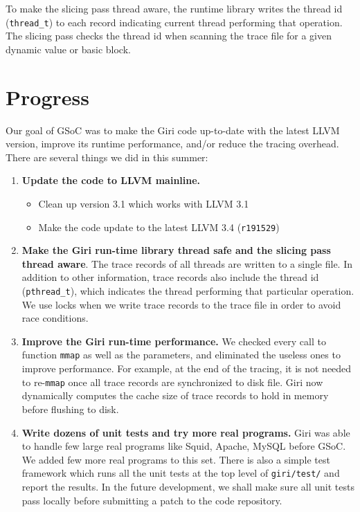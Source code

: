 \documentclass[DIV=calc, paper=a4, fontsize=11pt, twocolumn]{scrartcl}
\begin{document}
To make the slicing pass thread aware,
the runtime library writes the thread id (\texttt{thread\_t}) to each record indicating current thread performing that operation.
The slicing pass checks the thread id when scanning the trace file for a given dynamic value or basic block.

\section{Progress}
\label{sec:progress}
Our goal of GSoC was to make the Giri code up-to-date with the latest LLVM version, improve its runtime performance, and/or reduce the tracing overhead.
There are several things we did in this summer:
\begin{enumerate}
	\item \textbf{Update the code to LLVM mainline.}
		\begin{itemize}
			\item Clean up version 3.1 which works with LLVM 3.1
			\item Make the code update to the latest LLVM 3.4 (\texttt{r191529})
		\end{itemize}
	\item \textbf{Make the Giri run-time library thread safe and the slicing pass thread aware}.
		The trace records of all threads are written to a single file.
		In addition to other information, trace records also include the thread id (\texttt{pthread\_t}),
		which indicates the thread performing that particular operation.
		We use locks when we write trace records to the trace file in order to avoid race conditions.
	\item \textbf{Improve the Giri run-time performance.}
		We checked every call to function \texttt{mmap} as well as the parameters, and eliminated the useless ones to improve performance.
		For example, at the end of the tracing, it is not needed to re-\texttt{mmap} once all trace records are synchronized to disk file.
		Giri now dynamically computes the cache size of trace records to hold in memory before flushing to disk.
	\item \textbf{Write dozens of unit tests and try more real programs.}
		Giri was able to handle few large real programs like Squid, Apache, MySQL before GSoC.
		We added few more real programs to this set.
		There is also a simple test framework which runs all the unit tests at the top level of \texttt{giri/test/} and report the results.
		In the future development, we shall make sure all unit tests pass locally before submitting a patch to the code repository.

\end{enumerate}
\end{document}
